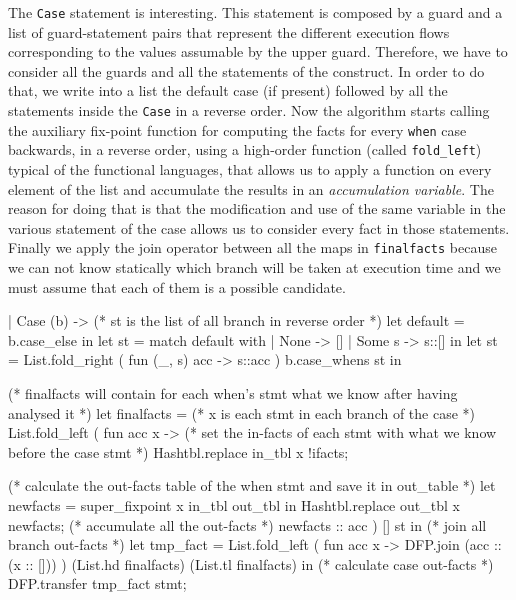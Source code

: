 \documentclass[a4paper]{article}   %
\begin{document}
The \texttt{Case} statement is interesting. This statement is composed by a guard and a list of guard-statement pairs that represent the different execution flows corresponding to the values assumable by the upper guard. Therefore, we have to consider all the guards and all the statements of the construct. 
In order to do that, we write into a list the default case (if present) followed by all the statements
%
inside the \texttt{Case} in a reverse order. Now the algorithm starts calling the auxiliary fix-point function for computing the facts for every \texttt{when} case 
backwards, 
in a reverse order,
%
using a high-order function (called \texttt{fold\_left}) typical of the functional languages, that allows us to apply a function on every element of the list and accumulate the results in an \emph{accumulation variable}. 
The reason for doing that is that the modification and use of the same variable in the various statement of the case allows us to consider every fact in those statements.
%
Finally we apply the join operator between all the maps in \texttt{finalfacts} because we can not know statically which branch will be taken at execution time and  we must assume that each of them is a possible candidate.



\begin{ocaml}
| Case (b) ->
	(* st is the list of all branch in reverse order *)
	let default = b.case_else in
	let st = match default with
		| None -> []
		| Some s -> s::[]
	in
	let st = List.fold_right ( fun (_, s) acc -> s::acc ) b.case_whens st in

	(* finalfacts will contain for each when's stmt what we know after having analysed it *)
	let finalfacts = 
	(* x is each stmt in each branch of the case *)
	List.fold_left ( fun acc x ->
		(* set the in-facts of each stmt with what we know before the case stmt *)
		Hashtbl.replace in_tbl x !ifacts;
		
		(* calculate the out-facts table of the when stmt and save it in out_table *)
		let newfacts = super_fixpoint x in_tbl out_tbl in
		Hashtbl.replace out_tbl x newfacts;
		(* accumulate all the out-facts *)
		newfacts :: acc
	) [] st
	in
	(* join all branch out-facts *)	
	let tmp_fact = List.fold_left ( fun acc x ->
        DFP.join (acc :: (x :: []))
	) (List.hd finalfacts) (List.tl finalfacts) 
	in
	(* calculate case out-facts *)
	DFP.transfer tmp_fact stmt;
\end{ocaml}
\end{document}
